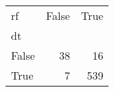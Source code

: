 \begin{tabular}{lrr}
\toprule
rf &  False &  True  \\
dt    &        &        \\
\midrule
False &     38 &     16 \\
True  &      7 &    539 \\
\bottomrule
\end{tabular}
